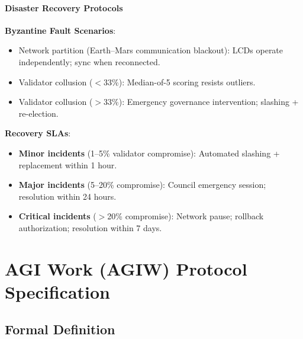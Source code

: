 \documentclass[11pt]{article}
\begin{document}
\paragraph{Disaster Recovery Protocols}
\textbf{Byzantine Fault Scenarios}:
\begin{itemize}[noitemsep]
  \item Network partition (Earth--Mars communication blackout): LCDs operate independently; sync when reconnected.
  \item Validator collusion ($<$33\%): Median-of-5 scoring resists outliers.
  \item Validator collusion ($>$33\%): Emergency governance intervention; slashing + re-election.
\end{itemize}

\textbf{Recovery SLAs}:
\begin{itemize}[noitemsep]
  \item \textbf{Minor incidents} (1--5\% validator compromise): Automated slashing + replacement within 1 hour.
  \item \textbf{Major incidents} (5--20\% compromise): Council emergency session; resolution within 24 hours.
  \item \textbf{Critical incidents} ($>$20\% compromise): Network pause; rollback authorization; resolution within 7 days.
\end{itemize}

\section{AGI Work (AGIW) Protocol Specification}
\label{sec:agiw-spec}

\subsection{Formal Definition}
\end{document}
